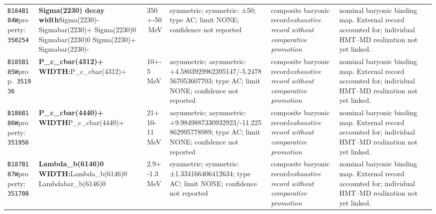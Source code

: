 \begin{landscape}
\begin{longtable}{L{1.85cm}L{4.45cm}L{2.35cm}L{4.05cm}L{3.35cm}L{7.15cm}}
\texttt{B184}\newline \texttt{B184W}\newline property:\ \texttt{350254} & \textbf{Sigma(2230) decay width}\newline Sigma(2230)- \textbar{}\allowbreak{} Sigmabar(2230)+ \textbar{}\allowbreak{} Sigma(2230)0 \textbar{}\allowbreak{} Sigmabar(2230)0 \textbar{}\allowbreak{} Sigma(2230)+ \textbar{}\allowbreak{} Sigmabar(2230)- & 350+-50\,MeV & symmetric; symmetric: ±50; type AC; limit NONE; confidence not reported & composite baryonic record\newline \emph{exhaustive record without comparative promotion} & nominal baryonic binding map. External record accounted for; individual HMT--MD realization not yet linked. \\
\texttt{B185}\newline \texttt{B185W}\newline prop.\ \texttt{351936} & \textbf{P\_\allowbreak{}c\_\allowbreak{}cbar(4312)+ WIDTH:}\newline P\_\allowbreak{}c\_\allowbreak{}cbar(4312)+ & 10+-5\,MeV & asymmetric; asymmetric: +4.5803929962395147/-5.2478567053607703; type AC; limit NONE; confidence not reported & composite baryonic record\newline \emph{exhaustive record without comparative promotion} & nominal baryonic binding map. External record accounted for; individual HMT--MD realization not yet linked. \\
\texttt{B186}\newline \texttt{B186W}\newline property:\ \texttt{351956} & \textbf{P\_\allowbreak{}c\_\allowbreak{}cbar(4440)+ WIDTH}\newline P\_\allowbreak{}c\_\allowbreak{}cbar(4440)+ & 21+10-11\,MeV & asymmetric; asymmetric: +9.9849887330932923/-11.225862995778989; type AC; limit NONE; confidence not reported & composite baryonic record\newline \emph{exhaustive record without comparative promotion} & nominal baryonic binding map. External record accounted for; individual HMT--MD realization not yet linked. \\
\texttt{B187}\newline \texttt{B187W}\newline property:\ \texttt{351708} & \textbf{Lambda\_\allowbreak{}b(6146)0 WIDTH:}\newline Lambda\_\allowbreak{}b(6146)0 \textbar{}\allowbreak{} Lambdabar\_\allowbreak{}b(6146)0 & 2.9+-1.3\,MeV & symmetric; symmetric: ±1.334166406412634; type AC; limit NONE; confidence not reported & composite baryonic record\newline \emph{exhaustive record without comparative promotion} & nominal baryonic binding map. External record accounted for; individual HMT--MD realization not yet linked. \\

\end{longtable}
\end{landscape}
